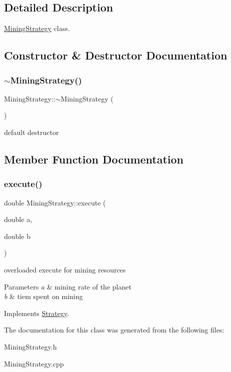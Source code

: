 \subsection{Detailed Description}
\hyperlink{classMiningStrategy}{Mining\+Strategy} class. 

\subsection{Constructor \& Destructor Documentation}
\mbox{\label{classMiningStrategy_a9d57c0f71bd7bcc4c13360b9406ceb8c}} 
\subsubsection{\texorpdfstring{$\sim$\+Mining\+Strategy()}{~MiningStrategy()}}
{\footnotesize\ttfamily Mining\+Strategy\+::$\sim$\+Mining\+Strategy (\begin{DoxyParamCaption}{ }\end{DoxyParamCaption})}

default destructor 

\subsection{Member Function Documentation}
\mbox{\label{classMiningStrategy_ace2ad68881b60573b90921a8087aee75}} 
\subsubsection{\texorpdfstring{execute()}{execute()}}
{\footnotesize\ttfamily double Mining\+Strategy\+::execute (\begin{DoxyParamCaption}\item[{double}]{a,  }\item[{double}]{b }\end{DoxyParamCaption})\hspace{0.3cm}{\ttfamily [virtual]}}

overloaded execute for mining resources 
\begin{DoxyParams}{Parameters}
{\em a} & mining rate of the planet \\
\hline
{\em b} & tiem spent on mining \\
\hline
\end{DoxyParams}


Implements \hyperlink{classStrategy_a81b8d4f53494c438b21fc999c7ea59f4}{Strategy}.



The documentation for this class was generated from the following files\+:\begin{DoxyCompactItemize}
\item 
Mining\+Strategy.\+h\item 
Mining\+Strategy.\+cpp\end{DoxyCompactItemize}
